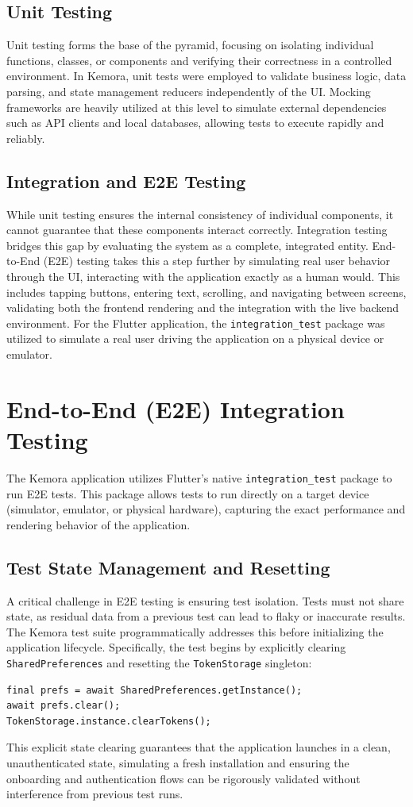 \subsection{Unit Testing}
Unit testing forms the base of the pyramid, focusing on isolating individual functions, classes, or components and verifying their correctness in a controlled environment. In Kemora, unit tests were employed to validate business logic, data parsing, and state management reducers independently of the UI. Mocking frameworks are heavily utilized at this level to simulate external dependencies such as API clients and local databases, allowing tests to execute rapidly and reliably.

\subsection{Integration and E2E Testing}
While unit testing ensures the internal consistency of individual components, it cannot guarantee that these components interact correctly. Integration testing bridges this gap by evaluating the system as a complete, integrated entity. End-to-End (E2E) testing takes this a step further by simulating real user behavior through the UI, interacting with the application exactly as a human would. This includes tapping buttons, entering text, scrolling, and navigating between screens, validating both the frontend rendering and the integration with the live backend environment. For the Flutter application, the \texttt{integration\_test} package was utilized to simulate a real user driving the application on a physical device or emulator.

\section{End-to-End (E2E) Integration Testing}
The Kemora application utilizes Flutter's native \texttt{integration\_test} package to run E2E tests. This package allows tests to run directly on a target device (simulator, emulator, or physical hardware), capturing the exact performance and rendering behavior of the application.

\subsection{Test State Management and Resetting}
A critical challenge in E2E testing is ensuring test isolation. Tests must not share state, as residual data from a previous test can lead to flaky or inaccurate results. The Kemora test suite programmatically addresses this before initializing the application lifecycle. Specifically, the test begins by explicitly clearing \texttt{SharedPreferences} and resetting the \texttt{TokenStorage} singleton:
\begin{verbatim}
final prefs = await SharedPreferences.getInstance();
await prefs.clear();
TokenStorage.instance.clearTokens();
\end{verbatim}
This explicit state clearing guarantees that the application launches in a clean, unauthenticated state, simulating a fresh installation and ensuring the onboarding and authentication flows can be rigorously validated without interference from previous test runs.

